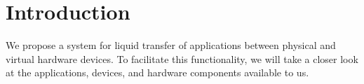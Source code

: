 \section{Introduction}

We propose a system for liquid transfer of applications between physical and virtual hardware devices.
To facilitate this functionality, we will take a closer look at the applications, devices, and hardware components available to us.